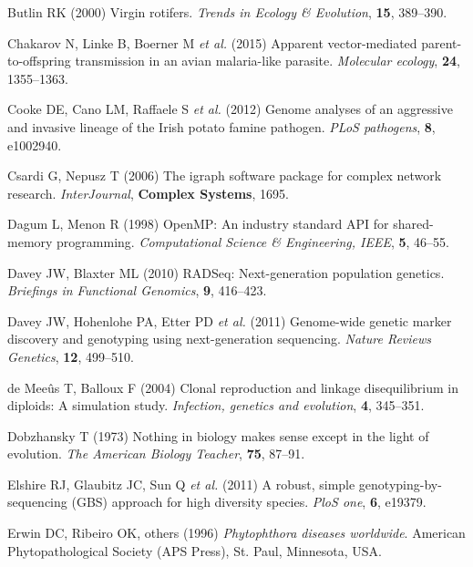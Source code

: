 \documentclass[double,12pt]{beavtex}
\begin{document}
  \hypertarget{ref-butlin2000virgin}{}
  Butlin RK (2000) Virgin rotifers. \emph{Trends in Ecology \& Evolution},
  \textbf{15}, 389--390.
  
  \hypertarget{ref-chakarov2015apparent}{}
  Chakarov N, Linke B, Boerner M \emph{et al.} (2015) Apparent
  vector-mediated parent-to-offspring transmission in an avian
  malaria-like parasite. \emph{Molecular ecology}, \textbf{24},
  1355--1363.
  
  \hypertarget{ref-cooke2012genome}{}
  Cooke DE, Cano LM, Raffaele S \emph{et al.} (2012) Genome analyses of an
  aggressive and invasive lineage of the Irish potato famine pathogen.
  \emph{PLoS pathogens}, \textbf{8}, e1002940.
  
  \hypertarget{ref-csardi2006igraph}{}
  Csardi G, Nepusz T (2006) The igraph software package for complex
  network research. \emph{InterJournal}, \textbf{Complex Systems}, 1695.
  
  \hypertarget{ref-dagum1998openmp}{}
  Dagum L, Menon R (1998) OpenMP: An industry standard API for
  shared-memory programming. \emph{Computational Science \& Engineering,
  IEEE}, \textbf{5}, 46--55.
  
  \hypertarget{ref-davey2010rad}{}
  Davey JW, Blaxter ML (2010) RADSeq: Next-generation population genetics.
  \emph{Briefings in Functional Genomics}, \textbf{9}, 416--423.
  
  \hypertarget{ref-davey2011genome}{}
  Davey JW, Hohenlohe PA, Etter PD \emph{et al.} (2011) Genome-wide
  genetic marker discovery and genotyping using next-generation
  sequencing. \emph{Nature Reviews Genetics}, \textbf{12}, 499--510.
  
  \hypertarget{ref-de2004clonal}{}
  de Meeûs T, Balloux F (2004) Clonal reproduction and linkage
  disequilibrium in diploids: A simulation study. \emph{Infection,
  genetics and evolution}, \textbf{4}, 345--351.
  
  \hypertarget{ref-dobzhansky2013nothing}{}
  Dobzhansky T (1973) Nothing in biology makes sense except in the light
  of evolution. \emph{The American Biology Teacher}, \textbf{75}, 87--91.
  
  \hypertarget{ref-elshire2011robust}{}
  Elshire RJ, Glaubitz JC, Sun Q \emph{et al.} (2011) A robust, simple
  genotyping-by-sequencing (GBS) approach for high diversity species.
  \emph{PloS one}, \textbf{6}, e19379.
  
  \hypertarget{ref-erwin1996phytophthora}{}
  Erwin DC, Ribeiro OK, others (1996) \emph{Phytophthora diseases
  worldwide}. American Phytopathological Society (APS Press), St. Paul,
  Minnesota, USA.
  
\end{document}

